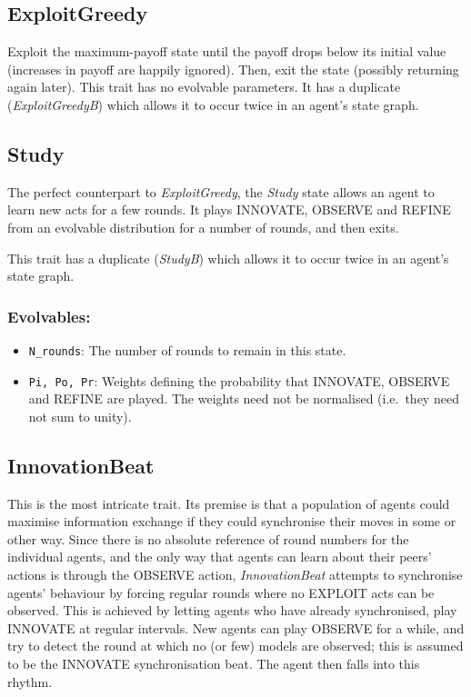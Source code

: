 \documentclass[a4paper,10pt]{article}
\begin{document}
\subsection{ExploitGreedy}
Exploit the maximum-payoff state until the payoff drops below its initial value (increases in payoff are happily
ignored). Then, exit the state (possibly returning again later). This trait has no evolvable parameters.
It has a duplicate
(\emph{ExploitGreedyB}) which allows it to occur twice
in an agent's state graph.

\subsection{Study}
The perfect counterpart to \emph{ExploitGreedy}, the \emph{Study} state allows an agent to learn new acts
for a few rounds. It plays INNOVATE, OBSERVE and REFINE from an evolvable distribution for a number of
rounds, and then exits.

This trait has a duplicate
(\emph{StudyB}) which allows it to occur twice
in an agent's state graph.

\subsubsection*{Evolvables:}
\begin{itemize}
 \item \texttt{N\_rounds}: The number of rounds to remain in this state.
 \item \texttt{Pi, Po, Pr}: Weights defining the probability that INNOVATE, OBSERVE and REFINE
   are played. The weights need not be normalised (i.e.\ they need not sum to unity).
\end{itemize}

\subsection{InnovationBeat}
This is the most intricate trait. Its premise is that a population of agents could maximise information
exchange if they could synchronise their moves in some or other way. Since there is no absolute reference
of round numbers for the individual agents, and the only way that agents can learn about their peers'
actions is through the OBSERVE action, \emph{InnovationBeat} attempts to synchronise agents' behaviour
by forcing regular rounds where no EXPLOIT acts can be observed. This is achieved by letting agents who have
already synchronised, play INNOVATE at regular intervals. New agents can play OBSERVE for a while, and
try to detect the round at which no (or few) models are observed; this is assumed to be the INNOVATE
synchronisation beat. The agent then falls into this rhythm.
\end{document}
